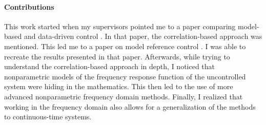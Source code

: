 \paragraph{Contributions}
This work started when my supervisors pointed me to a paper comparing model-based and data-driven control \cite{comparison_model-based_data-driven}. In that paper, the correlation-based approach was mentioned. This led me to a paper on model reference control \cite{Data-driven_model_reference_control}. I was able to recreate the results presented in that paper. Afterwards, while trying to understand the correlation-based approach in depth, I noticed that nonparametric models of the frequency response function of the uncontrolled system were hiding in the mathematics. This then led to the use of more advanced nonparametric frequency domain methods. Finally, I realized that working in the frequency domain also allows for a generalization of the methods to continuous-time systems.